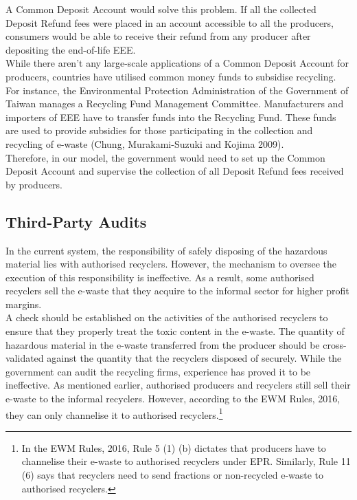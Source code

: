 \documentclass[a4paper, 12pt]{article}
\begin{document}
                    A Common Deposit Account would solve this problem. If all the collected Deposit Refund fees were placed in an account accessible to all the producers, consumers would be able to receive their refund from any producer after depositing the end-of-life EEE.\\
                    
                    While there aren’t any large-scale applications of a Common Deposit Account for producers, countries have utilised common money funds to subsidise recycling. For instance, the Environmental Protection Administration of the Government of Taiwan manages a Recycling Fund Management Committee. Manufacturers and importers of EEE have to transfer funds into the Recycling Fund. These funds are used to provide subsidies for those participating in the collection and recycling of e-waste (Chung, Murakami-Suzuki and Kojima 2009).\\
                    
                    Therefore, in our model, the government would need to set up the Common Deposit Account and supervise the collection of all Deposit Refund fees received by producers.\\
                    
                    \subsection{Third-Party Audits}
                    
                    In the current system, the responsibility of safely disposing of the hazardous material lies with authorised recyclers. However, the mechanism to oversee the execution of this responsibility is ineffective. As a result, some authorised recyclers sell the e-waste that they acquire to the informal sector for higher profit margins.\\
                    
                    A check should be established on the activities of the authorised recyclers to ensure that they properly treat the toxic content in the e-waste. The quantity of hazardous material in the e-waste transferred from the producer should be cross-validated against the quantity that the recyclers disposed of securely. While the government can audit the recycling firms, experience has proved it to be ineffective. As mentioned earlier, authorised producers and recyclers still sell their e-waste to the informal recyclers. However, according to the EWM Rules, 2016, they can only channelise it to authorised recyclers.\footnote{In the EWM Rules, 2016, Rule 5 (1) (b) dictates that producers have to channelise their e-waste to authorised recyclers under EPR. Similarly, Rule 11 (6) says that recyclers need to send fractions or non-recycled e-waste to authorised recyclers.}\\
                    
\end{document}
